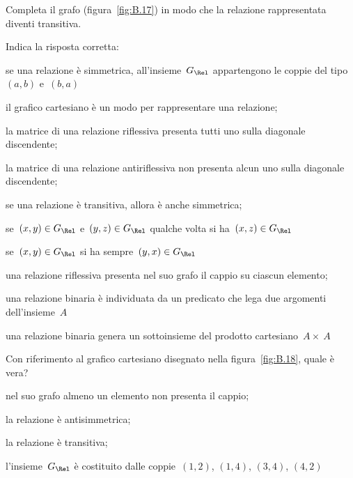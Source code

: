 \begin{multicols}{2}
\begin{esercizio}
\label{ese:B.26}
Completa il grafo (figura~\ref{fig:B.17}) in modo che la relazione 
rappresentata diventi transitiva.
\end{esercizio}

\begin{esercizio}
\label{ese:B.27}
Indica la risposta corretta:

\begin{enumeratea}
\TabPositions{12cm}
\item se una relazione è simmetrica, all'insieme~$G_\Rel$ appartengono le 
coppie del tipo~$(a,b)$ e~$(b,a)$
\item il grafico cartesiano è un modo per rappresentare una relazione;
\item la matrice di una relazione riflessiva presenta tutti uno sulla 
 diagonale discendente;
\item la matrice di una relazione antiriflessiva non presenta alcun uno sulla 
 diagonale discendente;
\item se una relazione è transitiva, allora è anche simmetrica;
\item se~$(x,y) \in G_\Rel$ e~$(y,z) \in G_\Rel$ qualche volta si 
 ha~$(x,z) \in G_\Rel$
\item se~$(x,y) \in G_\Rel$ si ha sempre~$(y,x) \in G_\Rel$
\item una relazione riflessiva presenta nel suo grafo il cappio su ciascun 
 elemento;
\item una relazione binaria è individuata da un predicato che lega due 
 argomenti dell'insieme~$A$
\item una relazione binaria genera un sottoinsieme del prodotto 
 cartesiano~$A \times~A$
\end{enumeratea}
\end{esercizio}

\begin{esercizio}
\label{ese:B.28}
Con riferimento al grafico cartesiano disegnato nella figura~\ref{fig:B.18}, 
quale è vera?

\begin{enumeratea}
\item nel suo grafo almeno un elemento non presenta il cappio;
\item la relazione è antisimmetrica;
\item la relazione è transitiva;
\item l'insieme~$G_\Rel$ è costituito dalle 
coppie~$(1,2)$, $(1,4)$, $(3,4)$, $(4,2)$
\end{enumeratea}
\end{esercizio}
\end{multicols}
